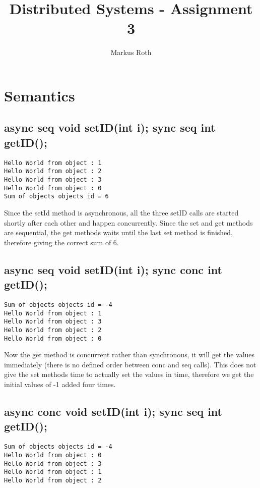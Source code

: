\documentclass[a4paper]{article}
\title{Distributed Systems - Assignment 3}
\author{Markus Roth}
\begin{document}
\maketitle

\section{Semantics}

\subsection{async seq void setID(int i); sync seq int getID();}

\begin{lstlisting}
Hello World from object : 1
Hello World from object : 2
Hello World from object : 3
Hello World from object : 0
Sum of objects objects id = 6
\end{lstlisting}

Since the setId method is asynchronous, all the three setID calls are started shortly after each other and happen concurrently. Since the set and get methods are sequential, the get methods waits until the last set method is finished, therefore giving the correct sum of 6.

\subsection{async seq void setID(int i); sync conc int getID();}

\begin{lstlisting}
Sum of objects objects id = -4
Hello World from object : 1
Hello World from object : 3
Hello World from object : 2
Hello World from object : 0
\end{lstlisting}

Now the get method is concurrent rather than synchronous, it will get the values immediately (there is no defined order between conc and seq calls). This does not give the set methods time to actually set the values in time, therefore we get the initial values of -1 added four times.

\subsection{async conc void setID(int i); sync seq int getID();}

\begin{lstlisting}
Sum of objects objects id = -4
Hello World from object : 0
Hello World from object : 3
Hello World from object : 1
Hello World from object : 2
\end{lstlisting}
\end{document}
